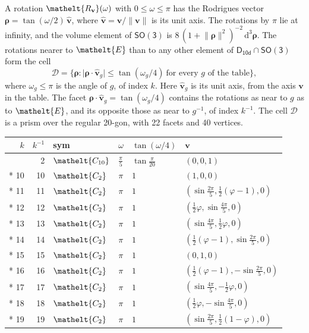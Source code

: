 \documentclass[10pt,a4paper]{article}
\numberwithin{equation}{section}
\newcommand{\eltfont}[1]{{\let\sigma\eltsigma\mathelt{#1}}}
\newcommand{\grp}[1]{\mathsf{#1}}
\newcommand{\cls}[1]{\eltfont{#1}}
\newcommand{\elt}[1]{\eltfont{#1}}
\newcommand{\dirvec}[3]{(#1, #2, #3)}
\newcommand{\unitaxis}{\hat{\mathbf{v}}}
\newcommand{\vv}{\mathbf{v}}
\newcommand{\diff}{\mathrm{d}}
\newcommand{\goldenratio}{\varphi}
\newcommand{\rodrigues}{\boldsymbol{\rho}}
\newcommand{\fcell}{\mathcal{D}}
\begin{document}
\leavevmode\label{n:vector.rodrigues}\label{n:vector.unitaxis}A rotation $\elt{R_{\vv}}(\omega)$ with $0 \le \omega \le \pi$ has the Rodrigues vector $\rodrigues = \tan(\omega/2)\,\unitaxis$, where $\unitaxis = \vv/\lVert\vv\rVert$ is its unit axis. The rotations by $\pi$ lie at infinity, and the volume element of \href{SO3.pdf}{$\grp{SO(3)}$} is $8\,(1 + \lVert\rodrigues\rVert^2)^{-2}\,\diff^3\rodrigues$.
\leavevmode\label{n:set.cell}The rotations nearer to $\elt{E}$ than to any other element of $\grp{D_{10d}} \cap \grp{SO(3)}$ form the cell
\begin{equation}\label{e:cell}\fcell = \bigl\{\rodrigues : \lvert\rodrigues\cdot\unitaxis_g\rvert \le \tan(\omega_g/4)\ \text{for every $g$ of the table}\bigr\},\end{equation}
where $\omega_g \le \pi$ is the angle of $g$, of index $k$. Here $\unitaxis_g$ is its unit axis, from the axis $\vv$ in the table. The facet $\rodrigues\cdot\unitaxis_g = \tan(\omega_g/4)$ contains the rotations as near to $g$ as to $\elt{E}$, and its opposite those as near to $g^{-1}$, of index $k^{-1}$. The cell $\fcell$ is a prism over the regular 20-gon, with 22 facets and 40 vertices.
{\small{\renewcommand{\arraystretch}{1.3}\begin{longtable}{@{}rrllll@{}}\toprule
$k$ & $k^{-1}$ & sym & $\omega$ & $\tan(\omega/4)$ & $\vv$\\\midrule\endhead
\bottomrule\endfoot\endlastfoot
1 & 2 & $\cls{C_{10}}$ & $\tfrac{\pi}{5}$ & $\tan\tfrac{\pi}{20}$ & $\dirvec{0}{0}{1}$\\*
10 & 10 & $\cls{C_{2}}$ & $\pi$ & $1$ & $\dirvec{1}{0}{0}$\\*
11 & 11 & $\cls{C_{2}}$ & $\pi$ & $1$ & $\dirvec{\sin\tfrac{2\pi}{5}}{\tfrac{1}{2}(\goldenratio - 1)}{0}$\\*
12 & 12 & $\cls{C_{2}}$ & $\pi$ & $1$ & $\dirvec{\tfrac{1}{2}\goldenratio{}}{\sin\tfrac{4\pi}{5}}{0}$\\*
13 & 13 & $\cls{C_{2}}$ & $\pi$ & $1$ & $\dirvec{\sin\tfrac{4\pi}{5}}{\tfrac{1}{2}\goldenratio{}}{0}$\\*
14 & 14 & $\cls{C_{2}}$ & $\pi$ & $1$ & $\dirvec{\tfrac{1}{2}(\goldenratio - 1)}{\sin\tfrac{2\pi}{5}}{0}$\\*
15 & 15 & $\cls{C_{2}}$ & $\pi$ & $1$ & $\dirvec{0}{1}{0}$\\*
16 & 16 & $\cls{C_{2}}$ & $\pi$ & $1$ & $\dirvec{\tfrac{1}{2}(\goldenratio - 1)}{-\sin\tfrac{2\pi}{5}}{0}$\\*
17 & 17 & $\cls{C_{2}}$ & $\pi$ & $1$ & $\dirvec{\sin\tfrac{4\pi}{5}}{-\tfrac{1}{2}\goldenratio{}}{0}$\\*
18 & 18 & $\cls{C_{2}}$ & $\pi$ & $1$ & $\dirvec{\tfrac{1}{2}\goldenratio{}}{-\sin\tfrac{4\pi}{5}}{0}$\\*
19 & 19 & $\cls{C_{2}}$ & $\pi$ & $1$ & $\dirvec{\sin\tfrac{2\pi}{5}}{\tfrac{1}{2}(1 - \goldenratio)}{0}$\\
\bottomrule\end{longtable}}}
\end{document}
